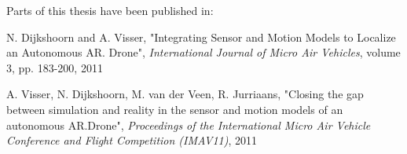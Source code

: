 \vspace{\baselineskip}

Parts of this thesis have been published in:

\vspace{\baselineskip}

N. Dijkshoorn and A. Visser, "Integrating Sensor and Motion Models to Localize an Autonomous AR. Drone", \textit{International Journal of Micro Air Vehicles}, volume 3, pp. 183-200, 2011

\vspace{\baselineskip}

A. Visser, N. Dijkshoorn, M. van der Veen, R. Jurriaans, "Closing the gap between simulation and reality in the sensor and motion models of an autonomous AR.Drone", \textit{Proceedings of the International Micro Air Vehicle Conference and Flight Competition (IMAV11)}, 2011
